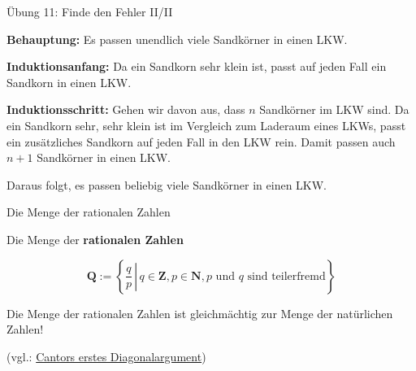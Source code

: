 \documentclass[12pt,ngerman,a4paper,ignorenonframetext,]{beamer}
\begin{document}
\begin{frame}{Übung 11: Finde den Fehler II/II}
\protect\hypertarget{ubung-11-finde-den-fehler-iiii}{}

\textbf{Behauptung:} Es passen unendlich viele Sandkörner in einen LKW.

\textbf{Induktionsanfang:} Da ein Sandkorn sehr klein ist, passt auf
jeden Fall ein Sandkorn in einen LKW.

\textbf{Induktionsschritt:} Gehen wir davon aus, dass \(n\) Sandkörner
im LKW sind. Da ein Sandkorn sehr, sehr klein ist im Vergleich zum
Laderaum eines LKWs, passt ein zusätzliches Sandkorn auf jeden Fall in
den LKW rein. Damit passen auch \(n+1\) Sandkörner in einen LKW.

Daraus folgt, es passen beliebig viele Sandkörner in einen LKW.

\end{frame}

\begin{frame}{Die Menge der rationalen Zahlen}
\protect\hypertarget{die-menge-der-rationalen-zahlen}{}

Die Menge der \textbf{rationalen Zahlen}

\begin{equation*}
        \mathbf{Q} := \left\{ \left.\frac{q}{p} \, \right| \, q \in \mathbf{Z}, p \in \mathbf{N}, p \text{ und } q \text{ sind teilerfremd} \right\}
\end{equation*}


\begin{Bemerkung}[]

Die Menge der rationalen Zahlen ist gleichmächtig zur Menge der
natürlichen Zahlen!

(vgl.: \href{http://tinyurl.com/p2k6u7f}{Cantors erstes
Diagonalargument})

\end{Bemerkung}

\end{frame}
\end{document}
